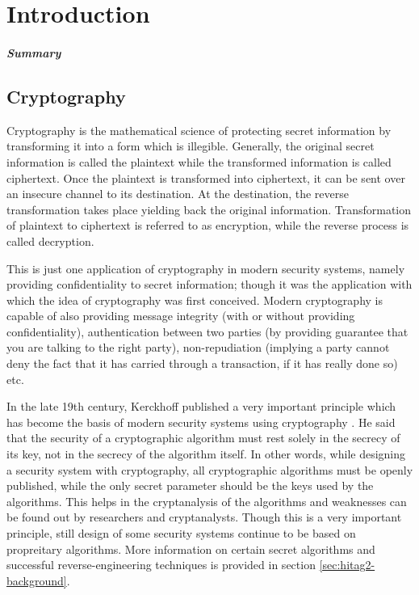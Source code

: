 \chapter{Introduction}
\label{chapter:intro}

\paragraph{Summary}


\section{Cryptography}

Cryptography is the mathematical science of protecting secret information by transforming it into a form which is illegible. Generally, the original secret information is called the plaintext while the transformed information is called ciphertext. Once the plaintext is transformed into ciphertext, it can be sent over an insecure channel to its destination. At the destination, the reverse transformation takes place yielding back the original information. Transformation of plaintext to ciphertext is referred to as encryption, while the reverse process is called decryption.

This is just one application of cryptography in modern security systems, namely providing confidentiality to secret information; though it was the application with which the idea of cryptography was first conceived. Modern cryptography is capable of also providing message integrity (with or without providing confidentiality), authentication between two parties (by providing guarantee that you are talking to the right party), non-repudiation (implying a party cannot deny the fact that it has carried through a transaction, if it has really done so) etc. 

In the late 19th century, Kerckhoff published a very important principle which has become the basis of modern security systems using cryptography \cite{kerckhoff}. He said that the security of a cryptographic algorithm must rest solely in the secrecy of its key, not in the secrecy of the algorithm itself. In other words, while designing a security system with cryptography, all cryptographic algorithms must be openly published, while the only secret parameter should be the keys used by the algorithms. This helps in the cryptanalysis of the algorithms and weaknesses can be found out by researchers and cryptanalysts. Though this is a very important principle, still design of some security systems continue to be based on propreitary algorithms. More information on certain secret algorithms and successful reverse-engineering techniques is provided in section \ref{sec:hitag2-background}.

